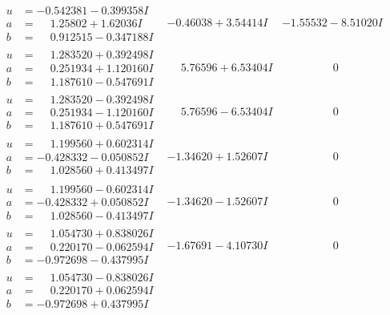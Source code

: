 \documentclass[1p]{elsarticle_modified}
\theoremstyle{definition}
\begin{document}
$$\begin{array}{c|c|c}
\begin{aligned}
u &= -0.542381 - 0.399358 I \\
a &= \phantom{-}1.25802 + 1.62036 I \\
b &= \phantom{-}0.912515 - 0.347188 I\end{aligned}
 & -0.46038 + 3.54414 I & -1.55532 - 8.51020 I \\ \hline\begin{aligned}
u &= \phantom{-}1.283520 + 0.392498 I \\
a &= \phantom{-}0.251934 + 1.120160 I \\
b &= \phantom{-}1.187610 - 0.547691 I\end{aligned}
 & \phantom{-}5.76596 + 6.53404 I & \phantom{-0.000000 } 0 \\ \hline\begin{aligned}
u &= \phantom{-}1.283520 - 0.392498 I \\
a &= \phantom{-}0.251934 - 1.120160 I \\
b &= \phantom{-}1.187610 + 0.547691 I\end{aligned}
 & \phantom{-}5.76596 - 6.53404 I & \phantom{-0.000000 } 0 \\ \hline\begin{aligned}
u &= \phantom{-}1.199560 + 0.602314 I \\
a &= -0.428332 - 0.050852 I \\
b &= \phantom{-}1.028560 + 0.413497 I\end{aligned}
 & -1.34620 + 1.52607 I & \phantom{-0.000000 } 0 \\ \hline\begin{aligned}
u &= \phantom{-}1.199560 - 0.602314 I \\
a &= -0.428332 + 0.050852 I \\
b &= \phantom{-}1.028560 - 0.413497 I\end{aligned}
 & -1.34620 - 1.52607 I & \phantom{-0.000000 } 0 \\ \hline\begin{aligned}
u &= \phantom{-}1.054730 + 0.838026 I \\
a &= \phantom{-}0.220170 - 0.062594 I \\
b &= -0.972698 - 0.437995 I\end{aligned}
 & -1.67691 - 4.10730 I & \phantom{-0.000000 } 0 \\ \hline\begin{aligned}
u &= \phantom{-}1.054730 - 0.838026 I \\
a &= \phantom{-}0.220170 + 0.062594 I \\
b &= -0.972698 + 0.437995 I\end{aligned}

\end{array}$$
\end{document}
